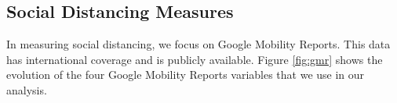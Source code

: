 \documentclass[11pt,reqno,letter]{amsart}
\theoremstyle{definition}
\begin{document}

\FloatBarrier

\subsection{Social Distancing Measures}

In measuring social distancing, we focus on Google Mobility
Reports. This data has international coverage and is publicly
available. Figure \ref{fig:gmr} shows the evolution of the four Google
Mobility Reports variables that we use in our analysis.
\end{document}
